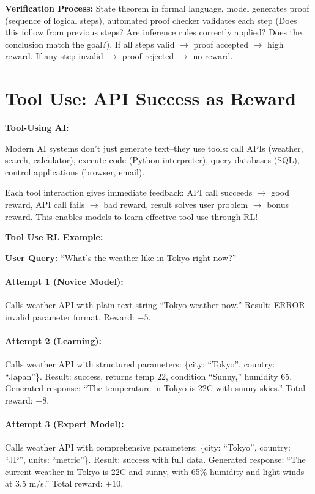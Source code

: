 \begin{chapterenv}
\begin{infobox}
\textbf{Verification Process:} State theorem in formal language, model generates proof (sequence of logical steps), automated proof checker validates each step (Does this follow from previous steps? Are inference rules correctly applied? Does the conclusion match the goal?). If all steps valid $\to$ proof accepted $\to$ high reward. If any step invalid $\to$ proof rejected $\to$ no reward.
\end{infobox}

\section{Tool Use: API Success as Reward}

\begin{infobox}
\textbf{Tool-Using AI:}

Modern AI systems don't just generate text--they use tools: call APIs (weather, search, calculator), execute code (Python interpreter), query databases (SQL), control applications (browser, email).

Each tool interaction gives immediate feedback: API call succeeds $\to$ good reward, API call fails $\to$ bad reward, result solves user problem $\to$ bonus reward. This enables models to learn effective tool use through RL!
\end{infobox}

\textbf{Tool Use RL Example:}

\textbf{User Query:} ``What's the weather like in Tokyo right now?''

\paragraph{Attempt 1 (Novice Model):} Calls weather API with plain text string ``Tokyo weather now.'' Result: ERROR--invalid parameter format. Reward: $-5$.

\paragraph{Attempt 2 (Learning):} Calls weather API with structured parameters: \{city: ``Tokyo'', country: ``Japan''\}. Result: success, returns temp 22, condition ``Sunny,'' humidity 65. Generated response: ``The temperature in Tokyo is 22C with sunny skies.'' Total reward: $+8$.

\paragraph{Attempt 3 (Expert Model):} Calls weather API with comprehensive parameters: \{city: ``Tokyo'', country: ``JP'', units: ``metric''\}. Result: success with full data. Generated response: ``The current weather in Tokyo is 22C and sunny, with 65\% humidity and light winds at 3.5 m/s.'' Total reward: $+10$.


\end{chapterenv}
